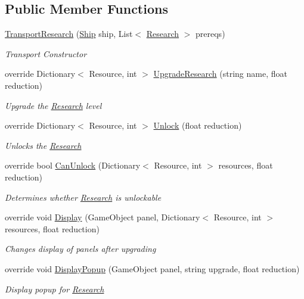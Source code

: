 \subsection*{Public Member Functions}
\begin{DoxyCompactItemize}
\item 
\hyperlink{class_transport_research_aa3225042d7866664ecb2c6a384b83e49}{Transport\+Research} (\hyperlink{class_ship}{Ship} ship, List$<$ \hyperlink{class_research}{Research} $>$ prereqs)
\begin{DoxyCompactList}\small\item\em Transport Constructor \end{DoxyCompactList}\item 
override Dictionary$<$ Resource, int $>$ \hyperlink{class_transport_research_a623f99655f4ac62ec9e1e8f4b9080cd7}{Upgrade\+Research} (string name, float reduction)
\begin{DoxyCompactList}\small\item\em Upgrade the \hyperlink{class_research}{Research} level \end{DoxyCompactList}\item 
override Dictionary$<$ Resource, int $>$ \hyperlink{class_transport_research_ac1a1136943af994003495a76ba7c57d1}{Unlock} (float reduction)
\begin{DoxyCompactList}\small\item\em Unlocks the \hyperlink{class_research}{Research} \end{DoxyCompactList}\item 
override bool \hyperlink{class_transport_research_a07e38e1835293484cf40ba021d5f15a2}{Can\+Unlock} (Dictionary$<$ Resource, int $>$ resources, float reduction)
\begin{DoxyCompactList}\small\item\em Determines whether \hyperlink{class_research}{Research} is unlockable \end{DoxyCompactList}\item 
override void \hyperlink{class_transport_research_a256529705ede8b7493da051a84f38cc1}{Display} (Game\+Object panel, Dictionary$<$ Resource, int $>$ resources, float reduction)
\begin{DoxyCompactList}\small\item\em Changes display of panels after upgrading \end{DoxyCompactList}\item 
override void \hyperlink{class_transport_research_ab0b2c9bbf90ebffd9b21be7a73a999e1}{Display\+Popup} (Game\+Object panel, string upgrade, float reduction)
\begin{DoxyCompactList}\small\item\em Display popup for \hyperlink{class_research}{Research} \end{DoxyCompactList}\end{DoxyCompactItemize}
